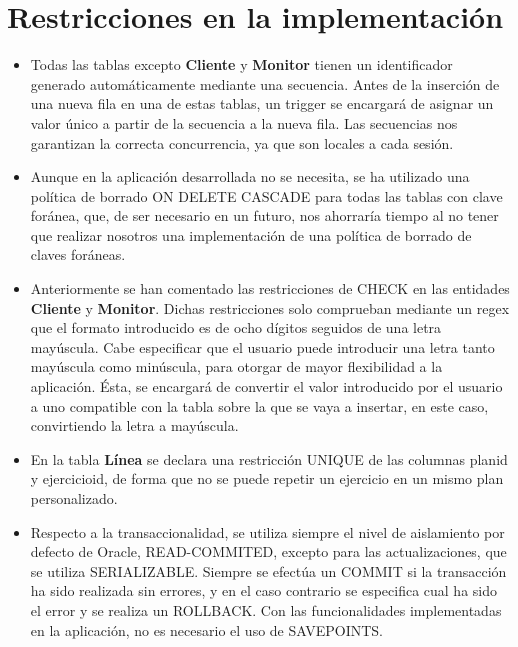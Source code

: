 \documentclass[12pt, a4paper]{article}
\begin{document}
	\section{Restricciones en la implementación}
	\begin{itemize}
		\item Todas las tablas excepto \textbf{Cliente} y \textbf{Monitor} tienen un identificador generado automáticamente mediante una secuencia. Antes de la inserción de una nueva fila en una de estas tablas, un trigger se encargará de asignar un valor único a partir de la secuencia a la nueva fila. Las secuencias nos garantizan la correcta concurrencia, ya que son locales a cada sesión.
		\item Aunque en la aplicación desarrollada no se necesita, se ha utilizado una política de borrado ON DELETE CASCADE para todas las tablas con clave foránea, que, de ser necesario en un futuro, nos ahorraría tiempo al no tener que realizar nosotros una implementación de una política de borrado de claves foráneas.
		\item Anteriormente se han comentado las restricciones de CHECK en las entidades \textbf{Cliente} y \textbf{Monitor}. Dichas restricciones solo comprueban mediante un regex que el formato introducido es de ocho dígitos seguidos de una letra mayúscula. Cabe especificar que el usuario puede introducir una letra tanto mayúscula como minúscula, para otorgar de mayor flexibilidad a la aplicación. Ésta, se encargará de convertir el valor introducido por el usuario a uno compatible con la tabla sobre la que se vaya a insertar, en este caso, convirtiendo la letra a mayúscula.
		\item En la tabla \textbf{Línea} se declara una restricción UNIQUE de las columnas plan\textunderscore id y ejercicio\textunderscore id, de forma que no se puede repetir un ejercicio en un mismo plan personalizado.
		\item Respecto a la transaccionalidad, se utiliza siempre el nivel de aislamiento por defecto de Oracle, READ-COMMITED, excepto para las actualizaciones, que se utiliza SERIALIZABLE. Siempre se efectúa un COMMIT si la transacción ha sido realizada sin errores, y en el caso contrario se especifica cual ha sido el error y se realiza un ROLLBACK. Con las funcionalidades implementadas en la aplicación, no es necesario el uso de SAVEPOINTS.
	\end{itemize}
	\label{LastPage} %
	
\end{document}
